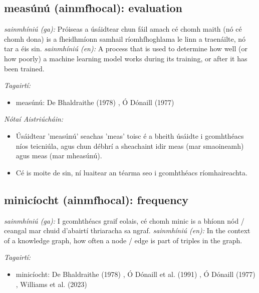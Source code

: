 \documentclass{article}
\begin{document}
\subsection*{measúnú (ainmfhocal): evaluation} 
 \noindent \textit{sainmhíniú (ga):} Próiseas a úsáidtear chun fáil amach cé chomh maith (nó cé chomh dona) is a fheidhmíonn samhail ríomhfhoghlama le linn a traenáilte, nó tar a éis sin.
\newline\newline
 \noindent \textit{sainmhíniú (en):} A process that is used to determine how well (or how poorly) a machine learning model works during its training, or after it has been trained.
\newline

 \noindent \textit{Tagairtí:}
\begin{itemize}
	\item measúnú: De Bhaldraithe (1978) \cite{de-bhaldraithe}, Ó Dónaill (1977) \cite{odonaill}
\end{itemize}

 \noindent \textit{Nótaí Aistriúcháin:}
\begin{itemize}
	\item Úsáidtear 'measúnú' seachas 'meas' toisc é a bheith úsáidte i gcomhthéacs níos teicniúla, agus chun débhrí a sheachaint idir meas (mar smaoineamh) agus meas (mar mheasúnú).
	\item Cé is moite de sin, ní luaitear an téarma seo i gcomhthéacs ríomhaireachta.
\end{itemize}


\subsection*{minicíocht (ainmfhocal): frequency} 
 \noindent \textit{sainmhíniú (ga):} I gcomhthéacs graif eolais, cé chomh minic is a bhíonn nód / ceangal mar chuid d'abairtí thriaracha sa ngraf.
\newline\newline
 \noindent \textit{sainmhíniú (en):} In the context of a knowledge graph, how often a node / edge is part of triples in the graph.
\newline

 \noindent \textit{Tagairtí:}
\begin{itemize}
	\item minicíocht: De Bhaldraithe (1978) \cite{de-bhaldraithe}, Ó Dónaill et al. (1991) \cite{focloir-beag}, Ó Dónaill (1977) \cite{odonaill}, Williams et al. (2023) \cite{storchiste}
\end{itemize}
\end{document}
